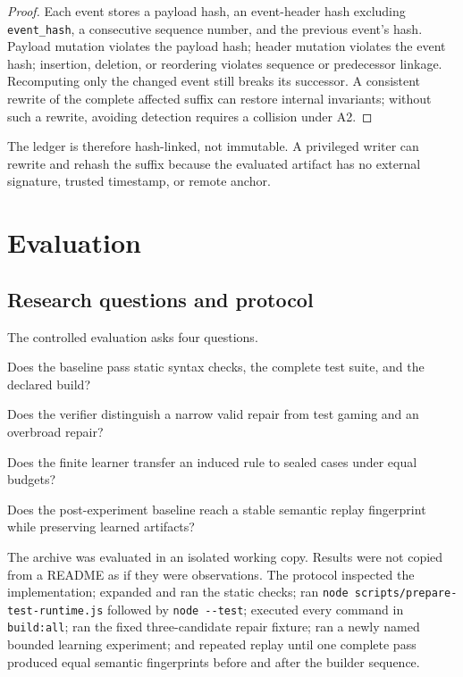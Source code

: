 \documentclass[10pt,twocolumn]{article}
\theoremstyle{definition}
\theoremstyle{plain}
\theoremstyle{remark}
\newcommand{\file}[1]{\nolinkurl{#1}}
\begin{document}
\begin{proof}
Each event stores a payload hash, an event-header hash excluding \file{event_hash}, a consecutive sequence number, and the previous event's hash.  Payload mutation violates the payload hash; header mutation violates the event hash; insertion, deletion, or reordering violates sequence or predecessor linkage.  Recomputing only the changed event still breaks its successor.  A consistent rewrite of the complete affected suffix can restore internal invariants; without such a rewrite, avoiding detection requires a collision under A2.
\end{proof}

The ledger is therefore hash-linked, not immutable.  A privileged writer can rewrite and rehash the suffix because the evaluated artifact has no external signature, trusted timestamp, or remote anchor.

\section{Evaluation}

\subsection{Research questions and protocol}

The controlled evaluation asks four questions.

\begin{description}[style=nextline,leftmargin=2.2em,font=\normalfont\bfseries]
\item[RQ1] Does the baseline pass static syntax checks, the complete test suite, and the declared build?
\item[RQ2] Does the verifier distinguish a narrow valid repair from test gaming and an overbroad repair?
\item[RQ3] Does the finite learner transfer an induced rule to sealed cases under equal budgets?
\item[RQ4] Does the post-experiment baseline reach a stable semantic replay fingerprint while preserving learned artifacts?
\end{description}

The archive was evaluated in an isolated working copy.  Results were not copied from a README as if they were observations.  The protocol inspected the implementation; expanded and ran the static checks; ran \file{node scripts/prepare-test-runtime.js} followed by \file{node --test}; executed every command in \file{build:all}; ran the fixed three-candidate repair fixture; ran a newly named bounded learning experiment; and repeated replay until one complete pass produced equal semantic fingerprints before and after the builder sequence.
\end{document}
